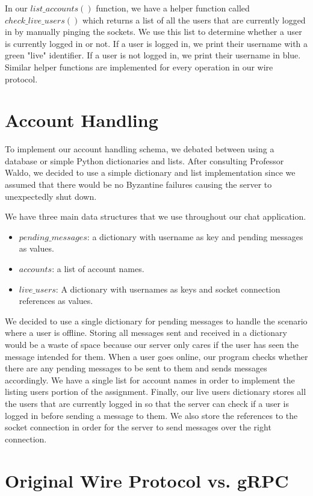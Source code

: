\documentclass[
	a4paper, %
	10pt, %
	unnumberedsections, %
	twoside, %
]{LTJournalArticle}
\begin{document}
In our $list\_accounts()$ function, we have a helper function called $check\_live\_users()$ which returns a list of all the users that are currently logged in by manually pinging the sockets. We use this list to determine whether a user is currently logged in or not. If a user is logged in, we print their username with a green "live" identifier. If a user is not logged in, we print their username in blue. Similar helper functions are implemented for every operation in our wire protocol.

\section{Account Handling}

To implement our account handling schema, we debated between using a database or simple Python dictionaries and lists. After consulting Professor Waldo, we decided to use a simple dictionary and list implementation since we assumed that there would be no Byzantine failures causing the server to unexpectedly shut down. 

We have three main data structures that we use throughout our chat application. 
\begin{itemize}
    \item $pending\_messages$: a dictionary with username as key and pending messages as values. 
    \item $accounts$: a list of account names. 
    \item $live\_users$: A dictionary with usernames as keys and socket connection references as values.
\end{itemize}

We decided to use a single dictionary for pending messages to handle the scenario where a user is offline. Storing all messages sent and received in a dictionary would be a waste of space because our server only cares if the user has seen the message intended for them. When a user goes online, our program checks whether there are any pending messages to be sent to them and sends messages accordingly. We have a single list for account names in order to implement the listing users portion of the assignment. Finally, our live users dictionary stores all the users that are currently logged in so that the server can check if a user is logged in before sending a message to them. We also store the references to the socket connection in order for the server to send messages over the right connection.

\section{Original Wire Protocol vs. gRPC}
\end{document}
